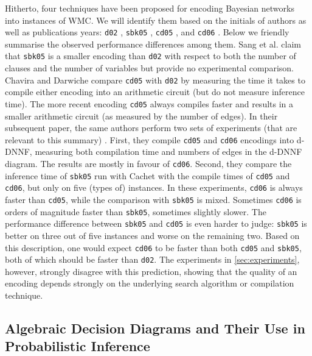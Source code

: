 \documentclass{article}
\theoremstyle{definition}
\theoremstyle{remark}
\begin{document}
Hitherto, four techniques have been proposed for encoding Bayesian networks into
instances of WMC. We will identify them based on the initials of authors as well
as publications years: \texttt{d02} \cite{DBLP:conf/kr/Darwiche02},
\texttt{sbk05} \cite{DBLP:conf/aaai/SangBK05}, \texttt{cd05}
\cite{DBLP:conf/ijcai/ChaviraD05}, and \texttt{cd06}
\cite{DBLP:conf/sat/ChaviraD06}. Below we friendly summarise the observed
performance differences among them. Sang et al. \cite{DBLP:conf/aaai/SangBK05}
claim that \texttt{sbk05} is a smaller encoding than \texttt{d02} with respect
to both the number of clauses and the number of variables but provide no
experimental comparison. Chavira and Darwiche \cite{DBLP:conf/ijcai/ChaviraD05}
compare \texttt{cd05} with \texttt{d02} by measuring the time it takes to
compile either encoding into an arithmetic circuit (but do not measure inference
time). The more recent encoding \texttt{cd05} always compiles faster and results
in a smaller arithmetic circuit (as measured by the number of edges). In their
subsequent paper, the same authors perform two sets of experiments (that are
relevant to this summary) \cite{DBLP:conf/sat/ChaviraD06}. First, they compile
\texttt{cd05} and \texttt{cd06} encodings into d-DNNF, measuring both
compilation time and numbers of edges in the d-DNNF diagram. The results are
mostly in favour of \texttt{cd06}. Second, they compare the inference time of
\texttt{sbk05} run with Cachet \cite{DBLP:conf/sat/SangBBKP04} with the compile
times of \texttt{cd05} and \texttt{cd06}, but only on five (types of) instances.
In these experiments, \texttt{cd06} is always faster than \texttt{cd05}, while
the comparison with \texttt{sbk05} is mixed. Sometimes \texttt{cd06} is orders
of magnitude faster than \texttt{sbk05}, sometimes slightly slower. The
performance difference between \texttt{sbk05} and \texttt{cd05} is even harder
to judge: \texttt{sbk05} is better on three out of five instances and worse on
the remaining two. Based on this description, one would expect \texttt{cd06} to
be faster than both \texttt{cd05} and \texttt{sbk05}, both of which should be
faster than \texttt{d02}. The experiments in \cref{sec:experiments}, however,
strongly disagree with this prediction, showing that the quality of an encoding
depends strongly on the underlying search algorithm or compilation technique.

\subsection{Algebraic Decision Diagrams and Their Use in Probabilistic
  Inference}
\end{document}
